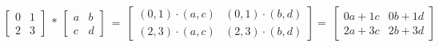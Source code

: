 \documentclass[12 pt]{slides}
\begin{document}
\begingroup
\[\begin{bmatrix}0 & 1\\2 & 3\end{bmatrix}\ *\ \begin{bmatrix}a & b\\c & d\end{bmatrix}\ =
\ \begin{bmatrix}(0,1) \cdot (a,c) & (0,1) \cdot (b,d)\\(2,3) \cdot (a,c) & (2,3) \cdot (b,d)\end{bmatrix} =\ 
\begin{bmatrix}0a + 1c & 0b + 1d\\2a + 3c & 2b + 3d\end{bmatrix}\]
\endgroup
\end{document}
